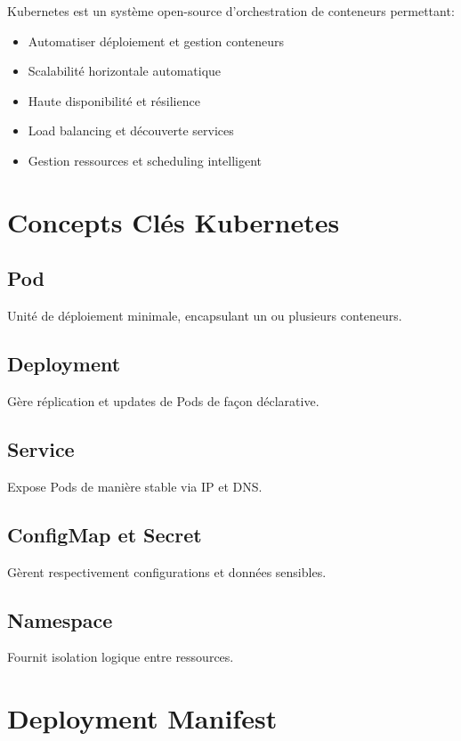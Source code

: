 \documentclass[12pt,a4paper]{report}
\begin{document}
Kubernetes est un système open-source d'orchestration de conteneurs permettant:
\begin{itemize}
    \item Automatiser déploiement et gestion conteneurs
    \item Scalabilité horizontale automatique
    \item Haute disponibilité et résilience
    \item Load balancing et découverte services
    \item Gestion ressources et scheduling intelligent
\end{itemize}

\section{Concepts Clés Kubernetes}

\subsection{Pod}
Unité de déploiement minimale, encapsulant un ou plusieurs conteneurs.

\subsection{Deployment}
Gère réplication et updates de Pods de façon déclarative.

\subsection{Service}
Expose Pods de manière stable via IP et DNS.

\subsection{ConfigMap et Secret}
Gèrent respectivement configurations et données sensibles.

\subsection{Namespace}
Fournit isolation logique entre ressources.

\section{Deployment Manifest}
\end{document}
